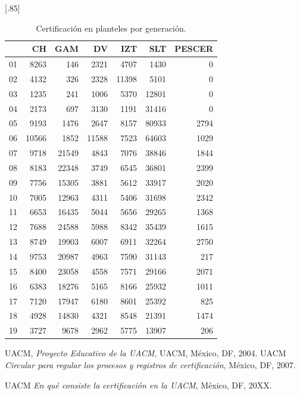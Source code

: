 \documentclass[12pt]{article}
\begin{document}
\begin{table}[ht]
\centering
\scalebox{0.75}[.85]{
\begin{tabular}{rrrrrrr}
  \hline
 & CH & GAM & DV & IZT & SLT & PESCER \\ 
  \hline
01 & 8263 & 146 & 2321 & 4707 & 1430 &   0 \\ 
  02 & 4132 & 326 & 2328 & 11398 & 5101 &   0 \\ 
  03 & 1235 & 241 & 1006 & 5370 & 12801 &   0 \\ 
  04 & 2173 & 697 & 3130 & 1191 & 31416 &   0 \\ 
  05 & 9193 & 1476 & 2647 & 8157 & 80933 & 2794 \\ 
  06 & 10566 & 1852 & 11588 & 7523 & 64603 & 1029 \\ 
  07 & 9718 & 21549 & 4843 & 7076 & 38846 & 1844 \\ 
  08 & 8183 & 22348 & 3749 & 6545 & 36801 & 2399 \\ 
  09 & 7756 & 15305 & 3881 & 5612 & 33917 & 2020 \\ 
  10 & 7005 & 12963 & 4311 & 5406 & 31698 & 2342 \\ 
  11 & 6653 & 16435 & 5044 & 5656 & 29265 & 1368 \\ 
  12 & 7688 & 24588 & 5988 & 8342 & 35439 & 1615 \\ 
  13 & 8749 & 19903 & 6007 & 6911 & 32264 & 2750 \\ 
  14 & 9753 & 20987 & 4963 & 7590 & 31143 & 217 \\ 
  15 & 8400 & 23058 & 4558 & 7571 & 29166 & 2071 \\ 
  16 & 6383 & 18276 & 5165 & 8166 & 25932 & 1011 \\ 
  17 & 7120 & 17947 & 6180 & 8601 & 25392 & 825 \\ 
  18 & 4928 & 14830 & 4321 & 8548 & 21391 & 1474 \\ 
  19 & 3727 & 9678 & 2962 & 5775 & 13907 & 206 \\ 
   \hline
\end{tabular}}
\caption{\label{Cert_Gen_Plantel}Certificaci\'on en planteles por generaci\'on.}
\end{table}

\begin{thebibliography}{20}
 \textsc{UACM},
\textit{Proyecto Educativo de la UACM},
UACM, M\'exico, DF, 2004.
 \textsc{UACM} 
\textit{Circular para regular los procesos y registros de certificaci\'on}, M\'exico, DF, 2007.

 \textsc{UACM} 
\textit{En qu\'e consiste la certificaci\'on en la UACM}, M\'exico, DF, 20XX.


\end{thebibliography}
\end{document}
